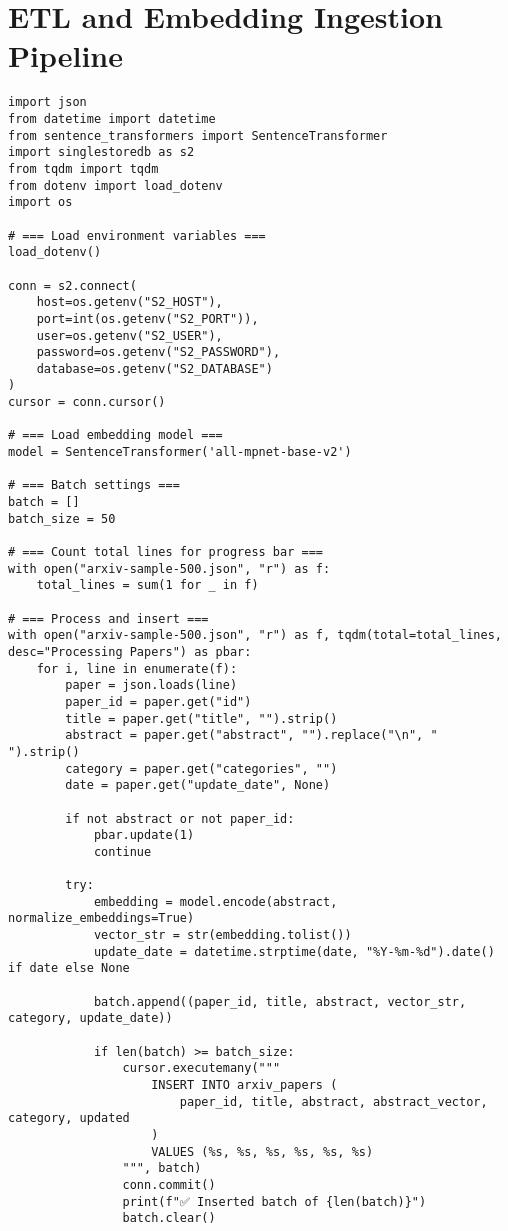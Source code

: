 \documentclass[11pt]{article}
\begin{document}
\section*{ETL and Embedding Ingestion Pipeline}
\label{sec:org1debf30}

\begin{verbatim}
import json
from datetime import datetime
from sentence_transformers import SentenceTransformer
import singlestoredb as s2
from tqdm import tqdm
from dotenv import load_dotenv
import os

# === Load environment variables ===
load_dotenv()

conn = s2.connect(
    host=os.getenv("S2_HOST"),
    port=int(os.getenv("S2_PORT")),
    user=os.getenv("S2_USER"),
    password=os.getenv("S2_PASSWORD"),
    database=os.getenv("S2_DATABASE")
)
cursor = conn.cursor()

# === Load embedding model ===
model = SentenceTransformer('all-mpnet-base-v2')

# === Batch settings ===
batch = []
batch_size = 50

# === Count total lines for progress bar ===
with open("arxiv-sample-500.json", "r") as f:
    total_lines = sum(1 for _ in f)

# === Process and insert ===
with open("arxiv-sample-500.json", "r") as f, tqdm(total=total_lines, desc="Processing Papers") as pbar:
    for i, line in enumerate(f):
        paper = json.loads(line)
        paper_id = paper.get("id")
        title = paper.get("title", "").strip()
        abstract = paper.get("abstract", "").replace("\n", " ").strip()
        category = paper.get("categories", "")
        date = paper.get("update_date", None)

        if not abstract or not paper_id:
            pbar.update(1)
            continue

        try:
            embedding = model.encode(abstract, normalize_embeddings=True)
            vector_str = str(embedding.tolist())
            update_date = datetime.strptime(date, "%Y-%m-%d").date() if date else None

            batch.append((paper_id, title, abstract, vector_str, category, update_date))

            if len(batch) >= batch_size:
                cursor.executemany("""
                    INSERT INTO arxiv_papers (
                        paper_id, title, abstract, abstract_vector, category, updated
                    )
                    VALUES (%s, %s, %s, %s, %s, %s)
                """, batch)
                conn.commit()
                print(f"✅ Inserted batch of {len(batch)}")
                batch.clear()


\end{verbatim}
\end{document}

